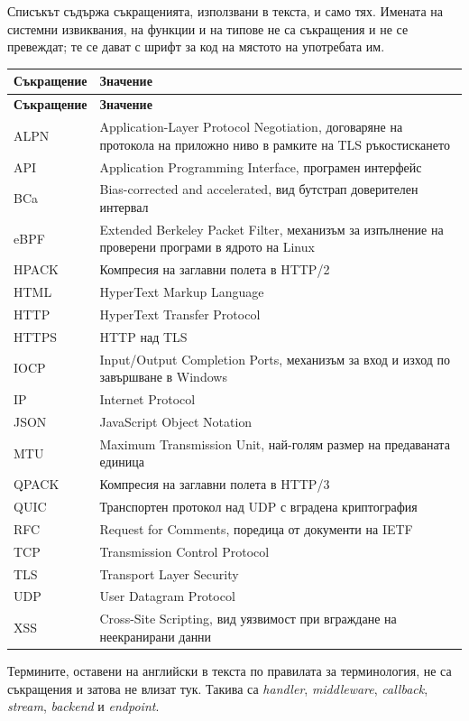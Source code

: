 \clearpage
{}
\section*{}

Списъкът съдържа съкращенията, използвани в текста, и само тях. Имената на системни
извиквания, на функции и на типове не са съкращения и не се превеждат; те се дават с
шрифт за код на мястото на употребата им.

\begin{longtable}{@{}L{3.0cm}L{11.5cm}@{}}
\toprule
\textbf{Съкращение} & \textbf{Значение} \\
\midrule
\endfirsthead
\toprule
\textbf{Съкращение} & \textbf{Значение} \\
\midrule
\endhead
\bottomrule
\endfoot

ALPN & Application-Layer Protocol Negotiation, договаряне на протокола на приложно ниво в рамките на TLS ръкостискането \cite{rfc7301} \\
API & Application Programming Interface, програмен интерфейс \\
BCa & Bias-corrected and accelerated, вид бутстрап доверителен интервал \cite{efron1987better} \\
eBPF & Extended Berkeley Packet Filter, механизъм за изпълнение на проверени програми в ядрото на Linux \\
HPACK & Компресия на заглавни полета в HTTP/2 \cite{rfc7541} \\
HTML & HyperText Markup Language \\
HTTP & HyperText Transfer Protocol \\
HTTPS & HTTP над TLS \\
IOCP & Input/Output Completion Ports, механизъм за вход и изход по завършване в Windows \\
IP & Internet Protocol \\
JSON & JavaScript Object Notation \\
MTU & Maximum Transmission Unit, най-голям размер на предаваната единица \\
QPACK & Компресия на заглавни полета в HTTP/3 \cite{rfc9114} \\
QUIC & Транспортен протокол над UDP с вградена криптография \cite{rfc9000} \\
RFC & Request for Comments, поредица от документи на IETF \\
TCP & Transmission Control Protocol \\
TLS & Transport Layer Security \\
UDP & User Datagram Protocol \\
XSS & Cross-Site Scripting, вид уязвимост при вграждане на неекранирани данни \\
\end{longtable}

\vspace{0.5em}
\noindent
Термините, оставени на английски в текста по правилата за терминология, не са съкращения и
затова не влизат тук. Такива са \emph{handler}, \emph{middleware}, \emph{callback},
\emph{stream}, \emph{backend} и \emph{endpoint}.
